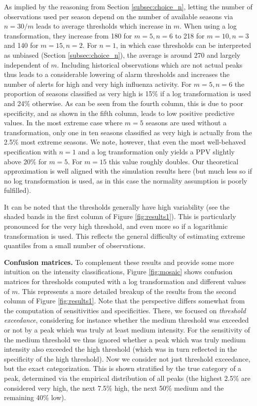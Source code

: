 \documentclass{article}
\begin{document}
As implied by the reasoning from Section \ref{subsec:choice_n}, letting the number of observations used per season depend on the number of available seasons via $n = 30/m$ leads to average thresholds which increase in $m$. When using a log transformation, they increase from 180 for $m = 5, n = 6$ to 218 for $m = 10, n = 3$ and 140 for $m = 15, n = 2$. For $n = 1$, in which case thresholds can be interpreted as unbiased (Section \ref{subsec:choice_n}), the average is around 270 and largely independent of $m$. Including historical observations which are not actual peaks thus leads to a considerable lowering of alarm thresholds and increases the number of alerts for high and very high influenza activity. For $m = 5, n = 6$ the proportion of seasons classified as very high is 15\% if a log transformation is used and 24\% otherwise. As can be seen from the fourth column, this is due to poor specificity, and as shown in the fifth column, leads to low positive predictive values. In the most extreme case where $m = 5$ seasons are used without a transformation, only one in ten seasons classified as very high is actually from the 2.5\% most extreme seasons. We note, however, that even the most well-behaved specification with $n = 1$ and a log transformation only yields a PPV slightly above 20\% for $m = 5$. For $m = 15$ this value roughly doubles. Our theoretical approximation is well aligned with the simulation results here (but much less so if no log transformation is used, as in this case the normality assumption is poorly fulfilled).


It can be noted that the thresholds generally have high variability (see the shaded bands in the first column of Figure \ref{fig:results1}). This is particularly pronounced for the very high threshold, and even more so if a logarithmic transformation is used. This reflects the general difficulty of estimating extreme quantiles from a small number of observations.

\textbf{Confusion matrices.} To complement these results and provide some more intuition on the intensity classifications, Figure \ref{fig:mosaic} shows confusion matrices for thresholds computed with a log transformation and different values of $m$. This represents a more detailed breakup of the results from the second column of Figure \ref{fig:results1}. Note that the perspective differs somewhat from the computation of sensitivities and specificities. There, we focused on \textit{threshold exceedance}, considering for instance whether the medium threshold was exceeded or not by a peak which was truly at least medium intensity. For the sensitivity of the medium threshold we thus ignored whether a peak which was truly medium intensity also exceeded the high threshold (which was in turn reflected in the specificity of the high threshold). Now we consider not just threshold exceedance, but the exact categorization. This is shown stratified by the true category of a peak, determined via the empirical distribution of all peaks (the highest 2.5\% are considered very high, the next 7.5\% high, the next 50\% medium and the remaining 40\% low).
\end{document}
